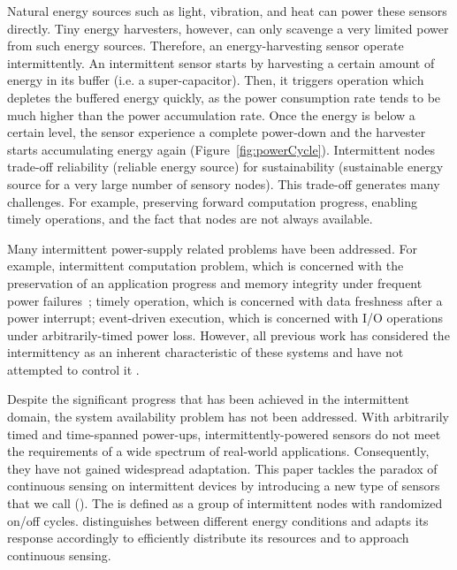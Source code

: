 Natural energy sources such as light, vibration, and heat can power these sensors directly. Tiny energy harvesters, however, can only scavenge a very limited power from such energy sources. Therefore, an energy-harvesting sensor operate intermittently. An intermittent sensor starts by harvesting a certain amount of energy in its buffer (i.e. a super-capacitor). Then, it triggers operation which depletes the buffered energy quickly, as the power consumption rate tends to be much higher than the power accumulation rate. Once the energy is below a certain level, the sensor experience a complete power-down and the harvester starts accumulating energy again (Figure~\ref{fig:powerCycle}). Intermittent nodes trade-off reliability (reliable energy source) for sustainability (sustainable energy source for a very large number of sensory nodes). This trade-off generates many challenges. For example, preserving forward computation progress, enabling timely operations, and the fact that nodes are not always available. 


Many intermittent power-supply related problems have been addressed. For example, intermittent computation problem, which is concerned with the preservation of an application progress and memory integrity under frequent power failures~\cite{mementos,dino,colin2016chain}; timely operation, which is concerned with data freshness after a power interrupt; event-driven execution, which is concerned with I/O operations under arbitrarily-timed power loss. However, all previous work has considered the intermittency as an inherent characteristic of these systems and have not attempted to control it .  

Despite the significant progress that has been achieved in the intermittent domain, the system availability problem has not been addressed. With arbitrarily timed and time-spanned power-ups, intermittently-powered sensors do not meet the requirements of a wide spectrum of real-world applications. Consequently, they have not gained widespread adaptation. This paper tackles the paradox of continuous sensing on intermittent devices by introducing a new type of sensors that we call \textit{\fullsys} (\sys). The \sys is defined as a group of intermittent nodes with randomized on/off cycles. \sys distinguishes between different energy conditions and adapts its response accordingly to efficiently distribute its resources and to approach continuous sensing.  

